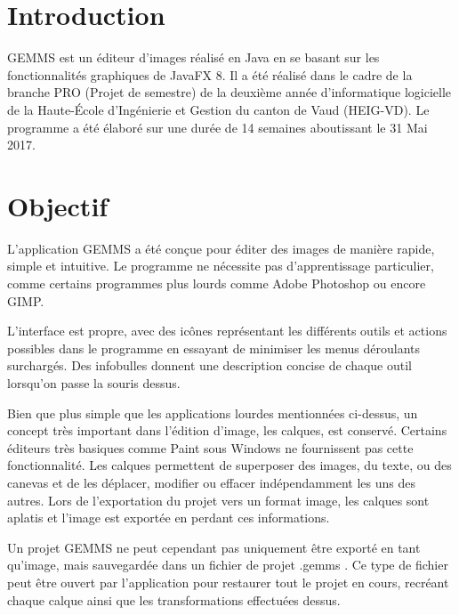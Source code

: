 \section{Introduction}
GEMMS est un éditeur d'images réalisé en Java en se basant sur les fonctionnalités graphiques de JavaFX 8. Il a été réalisé dans le cadre de la branche PRO (Projet de semestre) de la deuxième année d'informatique logicielle de la Haute-École d'Ingénierie et Gestion du canton de Vaud (HEIG-VD). 
Le programme a été élaboré sur une durée de 14 semaines aboutissant le 31 Mai 2017.

\section{Objectif}
L'application GEMMS a été conçue pour éditer des images de manière rapide, simple et intuitive. Le programme ne nécessite pas d'apprentissage particulier, comme certains programmes plus lourds comme Adobe Photoshop ou encore GIMP.

L'interface est propre, avec des icônes représentant les différents outils et actions possibles dans le programme en essayant de minimiser les menus déroulants surchargés. Des infobulles donnent une description concise de chaque outil lorsqu'on passe la souris dessus.

Bien que plus simple que les applications lourdes mentionnées ci-dessus, un concept très important dans l'édition d'image, les calques, est conservé. Certains éditeurs très basiques comme Paint sous Windows ne fournissent pas cette fonctionnalité. Les calques permettent de superposer des images, du texte, ou des canevas et de les déplacer, modifier ou effacer indépendamment les uns des autres. Lors de l'exportation du projet vers un format image, les calques sont aplatis et l'image est exportée en perdant ces informations.

Un projet GEMMS ne peut cependant pas uniquement être exporté en tant qu'image, mais sauvegardée dans un fichier de projet \og.gemms \fg{}. Ce type de fichier peut être ouvert par l'application pour restaurer tout le projet en cours, recréant chaque calque ainsi que les transformations effectuées dessus.